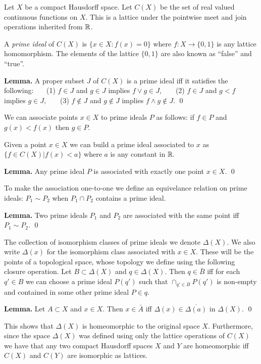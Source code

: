 \documentclass[11pt]{article}
\begin{document}
Let $X$ be a compact Hausdorff space.
Let $C(X)$ be the set of real valued continuous functions on $X$.
This is a lattice under the pointwise meet and join operations inherited from $\mathbb R$.

A \emph{prime ideal} of $C(X)$ is $\{x\in X:f(x)=0\}$ where $f:X\to \{0,1\}$
is any lattice homomorphism. 
The elements of the lattice $\{0, 1\}$ are also known as 
``false'' and ``true''.

{\bf Lemma.} A proper subset $J$ of $C(X)$ is a prime ideal
iff it satisfies the following:\newline
\ \ \ (1) $f\in J$ and $g\in J$ implies $f\vee g \in J,$ \newline
\ \ \ (2) $f\in J$ and $g<f$ implies $g\in J,$ \newline
\ \ \ (3) $f\notin J$ and $g\notin J$ implies $f\wedge g\notin J.$
\qed

We can associate points $x\in X$ to prime ideals $P$ as follows:
if $f\in P$ and $g(x)< f(x)$ then $g\in P.$

Given a point $x\in X$ we can build a prime ideal associated to $x$
as $\{f\in C(X) | f(x)<a\}$ where $a$ is any constant in $\mathbb R.$

{\bf Lemma.} Any prime ideal $P$ is associated with exactly one point $x\in X.$
\qed

To make the association one-to-one we
define an equivelance relation on prime ideals:
$P_1\sim P_2$ when $P_1\cap P_2$ contains a prime ideal.

{\bf Lemma.} Two prime ideals $P_1$ and $P_2$ are associated with the same
point iff $P_1\sim P_2.$
\qed

The collection of isomorphism classes of prime ideals we denote $\Delta(X).$
We also write $\Delta(x)$ for the isomorphism class associated with $x\in X.$
These will be the points of a topological space, whose topology we
define using the following closure operation.
Let $B\subset\Delta(X)$ and $q\in\Delta(X).$
Then $q\in\bar{B}$ iff 
for each $q'\in B$
we can choose a prime ideal $P(q')$ such that
$\cap_{q'\in B} P(q')$ is non-empty and contained in some other prime ideal $P\in q.$

{\bf Lemma.} Let $A\subset X$ and $x\in X$. Then $x\in\bar{A}$ iff
$\Delta(x)\in\overline{\Delta(a)}$ in $\Delta(X).$
\qed

This shows that $\Delta(X)$ is homeomorphic to the original space $X.$
Furthermore, since the space $\Delta(X)$
was defined using only the lattice operations of $C(X)$ we have that
any two compact Hausdorff spaces $X$ and $Y$ are homeomorphic iff $C(X)$ and
$C(Y)$ are isomorphic as lattices.
\end{document}
